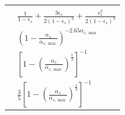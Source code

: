 \documentclass[11pt]{report}
\begin{document}
\begin{table}[h!]
\begin{center}
{\begin{tabular}{p{}|p{11.5cm}}
\hline\hline\\ 
\bf\citet{Carnahan-1969} &$
\displaystyle  \frac{1}{1-\epsilon_{s}}+\frac{3 \epsilon_{s}}{2\left(1-\epsilon_{s}\right)^{2}}+\frac{\epsilon_{s}^{2}}{2\left(1-\epsilon_{s}\right)^{3}}
$\\ \hline
\bf\citet{lun1986}&$
\displaystyle  \left(1-\frac{\alpha_{s}}{\alpha_{s, \max }}\right)^{-2.65 \alpha_{s, \max }}
$\\ \hline
\bf\citet{sinclair-1989} &$
\displaystyle  \left[1-\left(\frac{\alpha_{s}}{\alpha_{s, \max }}\right)^{\frac{1}{3}}\right]^{-1}
$\\ \hline
\bf\citet{GID-1994} & $ \displaystyle  \frac{3}{5}\left[1-\left(\frac{\alpha_{s}}{\alpha_{s, \max }}\right)^{\frac{1}{3}}\right]^{-1}
$\\
\hline\hline
\end{tabular}}
\end{center}
\end{table}
\end{document}
